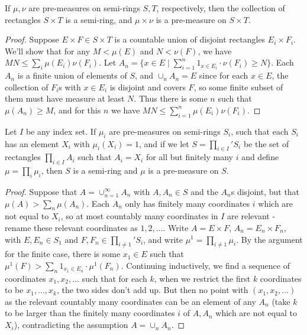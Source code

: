 \documentclass[letterpaper,11pt]{report}
\begin{document}
\begin{thm}\label{product-measure} If $\mu, \nu$ are pre-measures on semi-rings $S,T$, respectively, then the collection of rectangles $S\times T$ is a semi-ring, and $\mu\times \nu$ is a pre-measure on $S\times T$.
\end{thm}
\begin{proof} Suppose $E\times F \in S\times T$ is a countable union of disjoint rectangles $E_i \times F_i$. We'll show that for any $M < \mu(E)$ and $N < \nu(F)$, we have $MN \le \sum_i \mu(E_i)\nu(F_i)$. Let $A_n = \{x \in E \mid \sum_{i=1}^n 1_{x \in E_i}\cdot\nu(F_i) \ge N\}$. Each $A_n$ is a finite union of elements of $S$, and $\cup_n A_n = E$ since for each $x \in E$, the collection of $F_i$s with $x \in E_i$ is disjoint and covers $F$, so some finite subset of them must have measure at least $N$. Thus there is some $n$ such that $\mu(A_n) \ge M$, and for this $n$ we have $MN \le \sum_{i=1}^n \mu(E_i)\nu(F_i)$.
\end{proof}

\begin{thm} Let $I$ be any index set. If $\mu_i$ are pre-measures on semi-rings $S_i$, such that each $S_i$ has an element $X_i$ with $\mu_i(X_i) = 1$, and if we let $S = \prod_{i\in I}' S_i$ be the set of rectangles $\prod_{i \in I} A_i$ such that $A_i = X_i$ for all but finitely many $i$ and define $\mu = \prod_i \mu_i$, then $S$ is a semi-ring and $\mu$ is a pre-measure on $S$.
\end{thm}
\begin{proof} Suppose that $A = \cup_{n=1}^\infty A_n$ with $A, A_n \in S$ and the $A_n$s disjoint, but that $\mu(A) > \sum_n \mu(A_n)$. Each $A_n$ only has finitely many coordinates $i$ which are not equal to $X_i$, so at most countably many coordinates in $I$ are relevant - rename these relevant coordinates as $1, 2, ...$. Write $A = E \times F$, $A_n = E_n \times F_n$, with $E, E_n \in S_1$ and $F, F_n \in \prod_{i \ne 1}' S_i$, and write $\mu^1 = \prod_{i \ne 1} \mu_i$. By the argument for the finite case, there is some $x_1 \in E$ such that $\mu^1(F) > \sum_n 1_{x_1 \in E_n}\cdot \mu^1(F_n)$. Continuing inductively, we find a sequence of coordinates $x_1, x_2, ...$ such that for each $k$, when we restrict the first $k$ coordinates to be $x_1, ..., x_k$, the two sides don't add up. But then no point with $(x_1, x_2, ...)$ as the relevant countably many coordinates can be an element of any $A_n$ (take $k$ to be larger than the finitely many coordinates $i$ of $A, A_n$ which are not equal to $X_i$), contradicting the assumption $A = \cup_n A_n$.
\end{proof}
\end{document}
